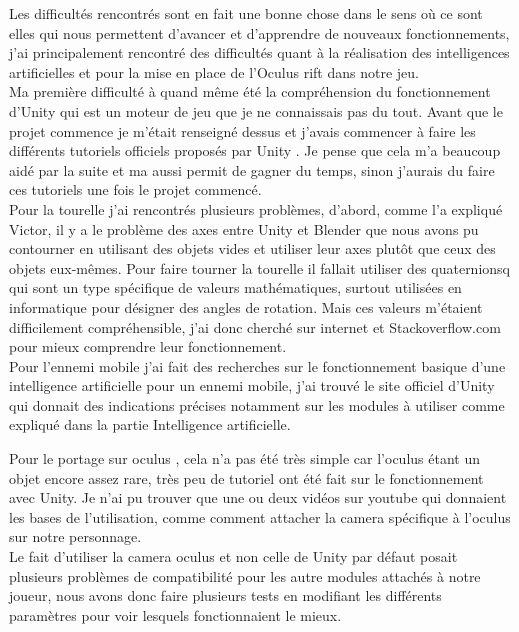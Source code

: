 \documentclass[12pt]{article}
\begin{document}
Les difficultés rencontrés sont en fait une bonne chose dans le sens où ce sont elles qui nous permettent d'avancer et d'apprendre de nouveaux fonctionnements, j'ai principalement rencontré des difficultés quant à la réalisation des intelligences artificielles et pour la mise en place de l'Oculus rift dans notre jeu.\\

Ma première difficulté à quand même été la compréhension du fonctionnement d'Unity qui est un moteur de jeu que je ne connaissais pas du tout. Avant que le projet commence je m'était renseigné dessus et j'avais commencer à faire les différents tutoriels officiels proposés par Unity \cite{tutounity}. Je pense que cela m'a beaucoup aidé par la suite et ma aussi permit de gagner du temps, sinon j'aurais du faire ces tutoriels une fois le projet commencé.\\
Pour la tourelle j'ai rencontrés plusieurs problèmes, d'abord, comme l'a expliqué Victor, il y a le problème des axes entre Unity et Blender \cite{blender} que nous avons pu contourner en utilisant des objets vides et utiliser leur axes plutôt que ceux des objets eux-mêmes. Pour faire tourner la tourelle il fallait utiliser des \gls{quaternions}q qui sont un type spécifique de valeurs mathématiques, surtout utilisées en informatique pour désigner des angles de rotation. Mais ces valeurs m'étaient difficilement compréhensible, j'ai donc cherché sur internet et Stackoverflow.com \cite{stackoverflow} pour mieux comprendre leur fonctionnement.\\

Pour l'ennemi mobile j'ai fait des recherches sur le fonctionnement basique d'une intelligence artificielle pour un ennemi mobile, j'ai trouvé le site officiel d'Unity \cite{unity} qui donnait des indications précises notamment sur les modules à utiliser comme expliqué dans la partie Intelligence artificielle.

\newpage

Pour le portage sur oculus , cela n'a pas été très simple car l'oculus étant un objet encore assez rare, très peu de tutoriel ont été fait sur le fonctionnement avec Unity. Je n'ai pu trouver que une ou deux vidéos sur youtube qui donnaient les bases de l'utilisation, comme comment attacher la camera spécifique à l'oculus sur notre personnage.\\
Le fait d'utiliser la camera oculus et non celle de Unity par défaut posait plusieurs problèmes de compatibilité pour les autre modules attachés à notre joueur, nous avons donc faire plusieurs tests en modifiant les différents paramètres pour voir lesquels fonctionnaient le mieux.\\
\end{document}
